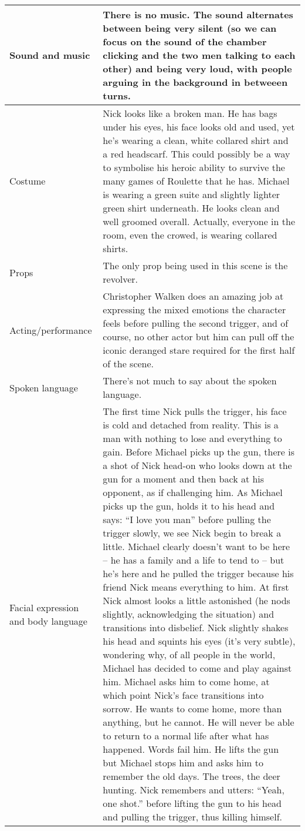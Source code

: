 \documentclass[notitlepage]{fhnwreport}
\begin{document}
\begin{center}
\begin{threeparttable}
	\begin{tabular}{p{5cm}p{11cm}}
		\midrule
		Sound and music &
There is no music. The sound alternates between being very silent (so we can focus on the sound of the chamber clicking and the two men talking to each other) and being very loud, with people arguing in the background in betweeen turns.\\
		\midrule
		Costume &
Nick looks like a broken man. He has bags under his eyes, his face looks old and used, yet he's wearing a clean, white collared shirt and a red headscarf. This could possibly be a way to symbolise his heroic ability to survive the many games of Roulette that he has. Michael is wearing a green suite and slightly lighter green shirt underneath. He looks clean and well groomed overall. Actually, everyone in the room, even the crowed, is wearing collared shirts. \\
		\midrule
		Props &
The only prop being used in this scene is the revolver. \\
		\midrule
		Acting/performance &
Christopher Walken does an amazing job at expressing the mixed emotions the character feels before pulling the second trigger, and of course, no other actor but him can pull off the iconic deranged stare required for the first half of the scene. \\
		\midrule
		Spoken language & 
There's not much to say about the spoken language. \\
		\midrule
		Facial expression and body language &
The first time Nick pulls the trigger, his face is cold and detached from reality. This is a man with nothing to lose and everything to gain. Before Michael picks up the gun, there is a shot of Nick head-on who looks down at the gun for a moment and then back at his opponent, as if challenging him. As Michael picks up the gun, holds it to his head and says: ``I love you man'' before pulling the trigger slowly, we see Nick begin to break a little. Michael clearly doesn't want to be here -- he has a family and a life to tend to -- but he's here and he pulled the trigger because his friend Nick means everything to him. At first Nick almost looks a little astonished (he nods slightly, acknowledging the situation) and transitions into disbelief. Nick slightly shakes his head and squints his eyes (it's very subtle), wondering why, of all people in the world, Michael has decided to come and play against him. Michael asks him to come home, at which point Nick's face transitions into sorrow. He wants to come home, more than anything, but he cannot. He will never be able to return to a normal life after what has happened. Words fail him. He lifts the gun but Michael stops him and asks him to remember the old days. The trees, the deer hunting. Nick remembers and utters: ``Yeah, one shot.'' before lifting the gun to his head and pulling the trigger, thus killing himself. \\
		\bottomrule
	\end{tabular}
\end{threeparttable}
\end{center}
\end{document}
